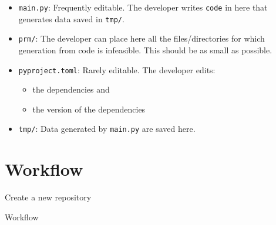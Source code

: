 \documentclass[journal]{IEEEtran}
\begin{document}
\begin{itemize}
\begin{itemize}
		\end{itemize}
	\item \texttt{main.py}: Frequently editable. The developer writes \texttt{code} in here that generates data saved in \texttt{tmp/}.
	\item \texttt{prm/}: The developer can place here all the files/directories for which generation from code is infeasible. This should be as small as possible.
	\item \texttt{pyproject.toml}: Rarely editable. The developer edits:
		\begin{itemize}
			\item the dependencies and
			\item the version of the dependencies
		\end{itemize}
	\item \texttt{tmp/}: Data generated by \texttt{main.py} are saved here.
\end{itemize}

\section{Workflow}

\begin{algorithm}
	Create a new repository\;
	\Return{}
	\caption{Workflow}
\end{algorithm}



\end{document}
